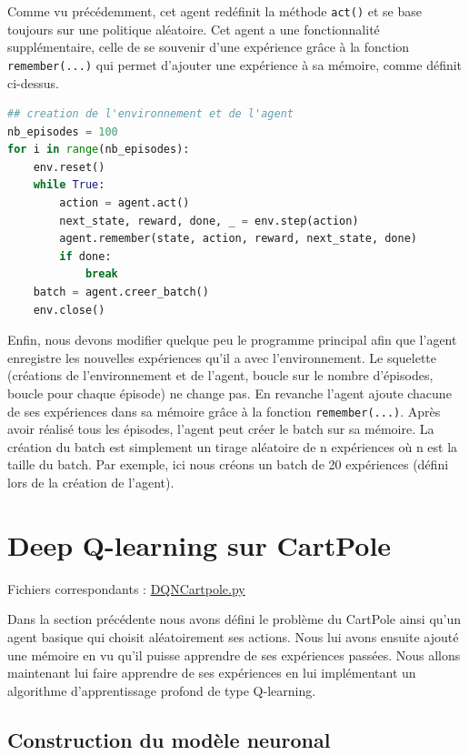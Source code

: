 \documentclass[10pt,a4paper]{article}
\begin{document}
Comme vu précédemment, cet agent redéfinit la méthode \lstinline{act()} et se base toujours sur une politique aléatoire. Cet agent a une fonctionnalité supplémentaire, celle de se souvenir d'une expérience grâce à la fonction \lstinline{remember(...)} qui permet d'ajouter une expérience à sa mémoire, comme définit ci-dessus.

\begin{lstlisting}[language=Python, caption=Programme principal de l'agent utilisant l'expérience replay]
## creation de l'environnement et de l'agent
nb_episodes = 100
for i in range(nb_episodes):
    env.reset()
    while True:
        action = agent.act()
        next_state, reward, done, _ = env.step(action)
        agent.remember(state, action, reward, next_state, done)
        if done:
            break
    batch = agent.creer_batch()
    env.close()
\end{lstlisting}

Enfin, nous devons modifier quelque peu le programme principal afin que l'agent enregistre les nouvelles expériences qu'il a avec l'environnement. Le squelette (créations de l'environnement et de l'agent, boucle sur le nombre d'épisodes, boucle pour chaque épisode) ne change pas. En revanche l'agent ajoute chacune de ses expériences dans sa mémoire grâce à la fonction \lstinline{remember(...)}. Après avoir réalisé tous les épisodes, l'agent peut créer le batch sur sa mémoire. La création du batch est simplement un tirage aléatoire de n expériences où n est la taille du batch. Par exemple, ici nous créons un batch de 20 expériences (défini lors de la création de l'agent).



\section{Deep Q-learning sur CartPole}
Fichiers correspondants : \href{https://github.com/NellyBarret/IA5-TP-APR/blob/master/sources/DQNCartPole.py}{DQNCartpole.py}

Dans la section précédente nous avons défini le problème du CartPole ainsi qu'un agent basique qui choisit aléatoirement ses actions. Nous lui avons ensuite ajouté  une mémoire en vu qu'il puisse apprendre de ses expériences passées. Nous allons maintenant lui faire apprendre de ses expériences en lui implémentant un algorithme d'apprentissage profond de type Q-learning.

\subsection{Construction du modèle neuronal}
\end{document}
